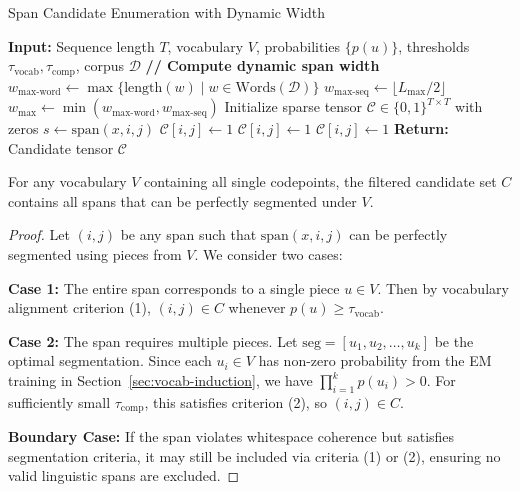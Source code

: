 \begin{algorithm}[H]
	\caption{Span Candidate Enumeration with Dynamic Width}
	\label{alg:span-candidates}
	\begin{algorithmic}[1]
		\STATE \textbf{Input:} Sequence length \(T\), vocabulary \(V\), probabilities \(\{p(u)\}\), 
		\STATE \qquad thresholds \(\tau_{\text{vocab}}, \tau_{\text{comp}}\), corpus \(\mathcal{D}\)
		\STATE \textbf{// Compute dynamic span width}
		\STATE \(w_{\text{max-word}} \leftarrow \max\{\text{length}(w) \mid w \in \text{Words}(\mathcal{D})\}\)
		\STATE \(w_{\text{max-seq}} \leftarrow \lfloor L_{\max} / 2 \rfloor\)
		\STATE \(w_{\max} \leftarrow \min(w_{\text{max-word}}, w_{\text{max-seq}})\)
		\STATE 
		\STATE Initialize sparse tensor \(\mathcal{C} \in \{0,1\}^{T \times T}\) with zeros
		\STATE \(s \leftarrow \text{span}(x, i, j)\) 
		\STATE \(\mathcal{C}[i,j] \leftarrow 1\)
		\STATE \(\mathcal{C}[i,j] \leftarrow 1\)
		\STATE \(\mathcal{C}[i,j] \leftarrow 1\)
		\ENDIF
		\ENDFOR
		\ENDFOR
		\STATE \textbf{Return:} Candidate tensor \(\mathcal{C}\)
	\end{algorithmic}
\end{algorithm}

\begin{proposition}
	For any vocabulary \(V\) containing all single codepoints, the filtered candidate set \(C\) contains all spans that can be perfectly segmented under \(V\).
\end{proposition}

\begin{proof}
	Let \((i,j)\) be any span such that \(\text{span}(x, i, j)\) can be perfectly segmented using pieces from \(V\). We consider two cases:
	
	\textbf{Case 1:} The entire span corresponds to a single piece \(u \in V\). Then by vocabulary alignment criterion (1), \((i,j) \in C\) whenever \(p(u) \geq \tau_{\text{vocab}}\).
	
	\textbf{Case 2:} The span requires multiple pieces. Let \(\text{seg} = [u_1, u_2, \ldots, u_k]\) be the optimal segmentation. Since each \(u_i \in V\) has non-zero probability from the EM training in Section~\ref{sec:vocab-induction}, we have \(\prod_{i=1}^k p(u_i) > 0\). For sufficiently small \(\tau_{\text{comp}}\), this satisfies criterion (2), so \((i,j) \in C\).
	
	\textbf{Boundary Case:} If the span violates whitespace coherence but satisfies segmentation criteria, it may still be included via criteria (1) or (2), ensuring no valid linguistic spans are excluded.
\end{proof}

